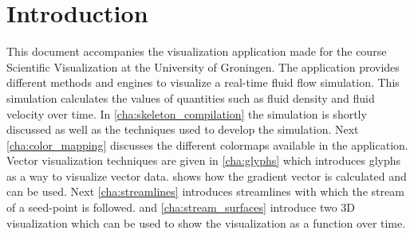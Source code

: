 \chapter*{Introduction} %
\label{cha:introduction}
 
This document accompanies the visualization application made for the course Scientific Visualization at the University of Groningen. The application provides different methods and engines to visualize a real-time fluid flow simulation. This simulation calculates the values of quantities such as fluid density and fluid velocity over time. In \cref{cha:skeleton_compilation} the simulation is shortly discussed as well as the techniques used to develop the simulation. Next \cref{cha:color_mapping} discusses the different colormaps available in the application. Vector visualization techniques are given in \cref{cha:glyphs} which introduces glyphs as a way to visualize vector data.  shows how the gradient vector is calculated and can be used. Next \cref{cha:streamlines} introduces streamlines with which the stream of a seed-point is followed.  and \cref{cha:stream_surfaces} introduce two 3D visualization which can be used to show the visualization as a function over time.

